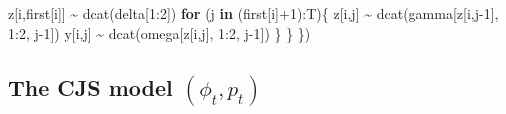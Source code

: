 \documentclass[
  12pt,
]{krantz}
\newenvironment{Shaded}{\begin{snugshade}}{\end{snugshade}}
\newcommand{\ControlFlowTok}[1]{\textcolor[rgb]{0.13,0.29,0.53}{\textbf{#1}}}
\newcommand{\DecValTok}[1]{\textcolor[rgb]{0.00,0.00,0.81}{#1}}
\newcommand{\FunctionTok}[1]{\textcolor[rgb]{0.00,0.00,0.00}{#1}}
\newcommand{\NormalTok}[1]{#1}
\newcommand{\SpecialCharTok}[1]{\textcolor[rgb]{0.00,0.00,0.00}{#1}}
\begin{document}
\begin{Shaded}
\begin{Highlighting}[]
\NormalTok{    z[i,first[i]] }\SpecialCharTok{\textasciitilde{}} \FunctionTok{dcat}\NormalTok{(delta[}\DecValTok{1}\SpecialCharTok{:}\DecValTok{2}\NormalTok{])}
    \ControlFlowTok{for}\NormalTok{ (j }\ControlFlowTok{in}\NormalTok{ (first[i]}\SpecialCharTok{+}\DecValTok{1}\NormalTok{)}\SpecialCharTok{:}\NormalTok{T)\{}
\NormalTok{      z[i,j] }\SpecialCharTok{\textasciitilde{}} \FunctionTok{dcat}\NormalTok{(gamma[z[i,j}\DecValTok{{-}1}\NormalTok{], }\DecValTok{1}\SpecialCharTok{:}\DecValTok{2}\NormalTok{, j}\DecValTok{{-}1}\NormalTok{])}
\NormalTok{      y[i,j] }\SpecialCharTok{\textasciitilde{}} \FunctionTok{dcat}\NormalTok{(omega[z[i,j], }\DecValTok{1}\SpecialCharTok{:}\DecValTok{2}\NormalTok{, j}\DecValTok{{-}1}\NormalTok{])}
\NormalTok{    \}}
\NormalTok{  \}}
\NormalTok{\})}
\end{Highlighting}
\end{Shaded}

\hypertarget{the-cjs-model-phi_t-p_t-1}{%
\subsection{\texorpdfstring{The CJS model \((\phi_t, p_t)\)}{The CJS model (\textbackslash phi\_t, p\_t)}}\label{the-cjs-model-phi_t-p_t-1}}
\end{document}
